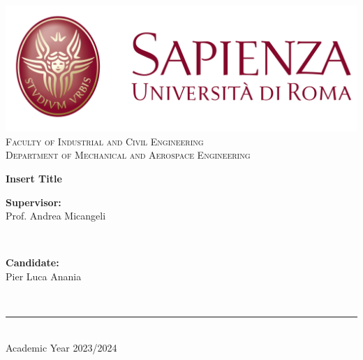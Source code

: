 \begin{titlepage}
	\centering
    \vspace*{0.5 cm}
    \includegraphics[scale = 0.55]{figures/logo_sapienza_new.jpg}\\[1.0 cm]	%

    \vspace*{-0.4cm}
    \textsc{\large Faculty of Industrial and Civil Engineering}\\[1.0 cm]	%
    \textsc{\large Department of Mechanical and Aerospace Engineering}\\[2.0 cm]	%
    \vspace*{1cm}

  { \fontsize{20.74pt}{18.5pt}\selectfont\bfseries Insert Title } %

    \vspace*{0.25cm}

    \vspace*{2.6cm}
	\begin{minipage}{0.4\textwidth} %
		\begin{flushleft} \large
			\textbf{Supervisor:}\\
			Prof. Andrea Micangeli\\
		\end{flushleft}
	\end{minipage}~
	\begin{minipage}{0.3\textwidth} %
		\begin{flushright} \large
		\begin{minipage}{1\textwidth}
		\begin{flushleft} \large
			\textbf{Candidate:} \\
		
                Pier Luca Anania 
                \\
        \end{flushleft}
        \end{minipage}
		\end{flushright}
	\end{minipage}\\[3.85 cm]

    \vspace{2cm}
    \rule{\linewidth}{0.2 mm} \\[0.3 cm]
    \vspace*{-0.2cm}
    Academic Year 2023/2024
\end{titlepage}